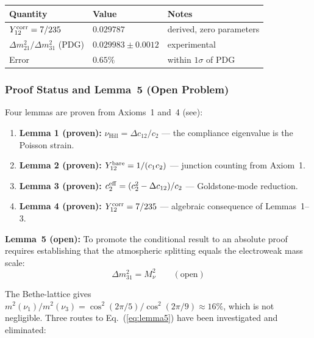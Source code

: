 \begin{center}
\begin{tabular}{lll}
\hline
Quantity & Value & Notes \\ \hline
$Y_{12}^{\rm corr} = 7/235$ & $0.029787$ & derived, zero parameters \\
$\Delta m^2_{21}/\Delta m^2_{31}$ (PDG) & $0.029983\pm0.0012$ & experimental \\
Error & $0.65\%$ & within $1\sigma$ of PDG \\
\hline
\end{tabular}
\end{center}

\subsubsection{Proof Status and Lemma~5 (Open Problem)}
\label{sec:lemma5}

Four lemmas are proven from Axioms~1 and~4 (see\linebreak {}):

\begin{enumerate}
  \item \textbf{Lemma 1 (proven):} $\nu_{\text{Hill}} = \Delta c_{12}/c_2$ --- the compliance eigenvalue is the Poisson strain.
  \item \textbf{Lemma 2 (proven):} $Y_{12}^{\rm bare} = 1/(c_1 c_2)$ --- junction counting from Axiom~1.
  \item \textbf{Lemma 3 (proven):} $c_2^{\rm eff} = (c_2^2-\Delta c_{12})/c_2$ --- Goldstone-mode reduction.
  \item \textbf{Lemma 4 (proven):} $Y_{12}^{\rm corr} = 7/235$ --- algebraic consequence of Lemmas~1--3.
\end{enumerate}

\noindent\textbf{Lemma~5 (open):} To promote the conditional result to an absolute proof requires establishing that the atmospheric splitting equals the electroweak mass scale:
\begin{equation}
    \Delta m^2_{31} = M_\nu^2 \qquad (\text{open})
    \label{eq:lemma5}
\end{equation}

The Bethe-lattice gives $m^2(\nu_1)/m^2(\nu_3) = \cos^2(2\pi/5)/\cos^2(2\pi/9) \approx 16\%$, which is not negligible.  Three routes to Eq.~(\ref{eq:lemma5}) have been investigated and eliminated:

